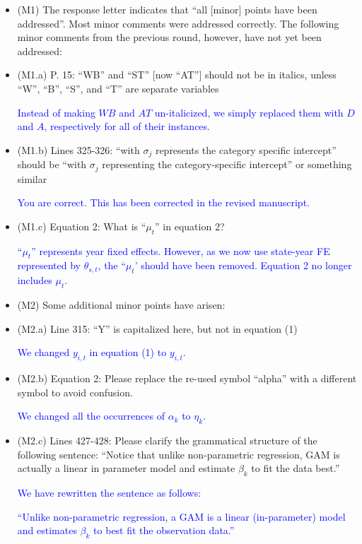 \documentclass[
]{article}
\begin{document}
\begin{itemize}

\item (M1) The response letter indicates that ``all [minor] points have been addressed''. Most minor comments were addressed correctly. The following minor comments from the previous round, however, have not yet been addressed:

\item (M1.a) P. 15: ``WB'' and ``ST'' [now ``AT''] should not be in italics, unless ``W'', ``B'', ``S'', and ``T'' are separate variables

\textcolor{blue}{Instead of making $WB$ and $AT$ un-italicized, we simply replaced them with $D$ and $A$, respectively for all of their instances.}

\item (M1.b) Lines 325-326: ``with $\sigma_j$ represents the category specific intercept'' should be ``with $\sigma_j$ representing the category-specific intercept'' or something similar

\textcolor{blue}{You are correct. This has been corrected in the revised manuscript.}

\item (M1.c) Equation 2: What is ``$\mu_t$'' in equation 2?

\textcolor{blue}{``$\mu_t$'' represents year fixed effects. However, as we now use state-year FE represented by $\theta_{s,t}$, the ``$\mu_t$' should have been removed. Equation 2 no longer includes $\mu_t$.}

\item (M2) Some additional minor points have arisen:

\item (M2.a) Line 315: ``Y'' is capitalized here, but not in equation (1)

\textcolor{blue}{We changed $y_{i,t}$ in equation (1) to $y_{i,t}$.}

\item (M2.b) Equation 2: Please replace the re-used symbol ``alpha'' with a different symbol to avoid confusion.

\textcolor{blue}{We changed all the occurrences of $\alpha_{k}$ to $\eta_{k}$.}

\item (M2.c) Lines 427-428: Please clarify the grammatical structure of the following sentence: ``Notice that unlike non-parametric regression, GAM is actually a linear in parameter model and estimate $\beta_k$ to fit the data best.''

\textcolor{blue}{We have rewritten the sentence as follows:}

\textcolor{blue}{``Unlike non-parametric regression, a GAM is a linear (in-parameter) model and estimates $\beta_k$ to best fit the observation data.''}

\end{itemize}
\end{document}
